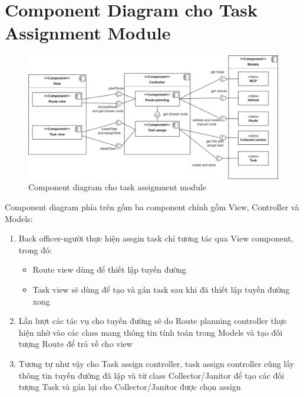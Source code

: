 \section{Component Diagram cho Task Assignment Module}
    \begin{figure}[h]
        \centering
        \includegraphics[width=1\linewidth]{imgs/component diagram/component Task Assignment.png}
        \caption{Component diagram cho task assignment module}
    \end{figure}
    Component diagram phía trên gồm ba component chính gồm View, Controller và Models:
    \begin{enumerate}
        \item Back officer-người thực hiện assgin task chỉ tương tác qua View component, trong đó:
        \begin{itemize}
            \item Route view dùng để thiết lập tuyến đường
            \item Task view sẽ dùng để tạo và gán task sau khi đã thiết lập tuyến đường xong
        \end{itemize}
        \item Lần lượt các tác vụ cho tuyến đường sẽ do Route planning controller thực hiện nhờ vào các class mang thông tin tính toán trong Models và tạo đối tượng Route để trả về cho view
        \item Tương tự như vậy cho Task assign controller, task assign controller cũng lấy thông tin tuyến đường đã lập và từ class Collector/Janitor để tạo các đối tượng Task và gán lại cho Collector/Janitor được chọn assign
    \end{enumerate}